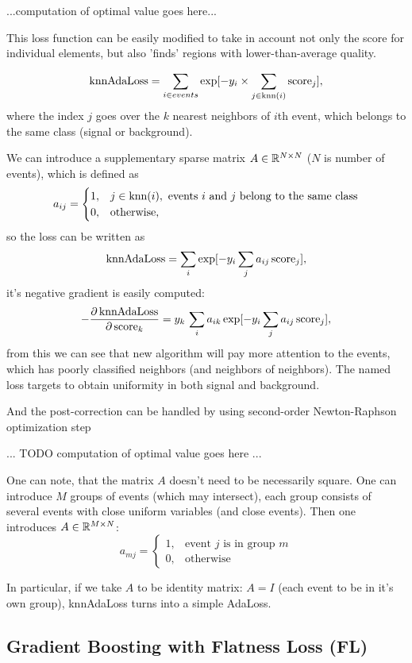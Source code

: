 ...computation of optimal value goes here...

This loss function can be easily modified to take in account not only the score for individual elements, but also 'finds' regions with lower-than-average quality.

\[
	\text{knnAdaLoss} = \sum_{i \in events} \exp[-y_i \times \sum_{j \in \text{knn}(i)} \text{score}_j],
\]
where the index $j$ goes over the $k$ nearest neighbors of $i$th event, which belongs to the same class (signal or background).

We can introduce a supplementary sparse matrix $A \in \mathbb{R}^{N \times N}$ ($N$ is number of events), which is defined as 
\[
a_{ij} = \begin{cases} 
1, & j \in \text{knn}(i), \text{ events $i$ and $j$ belong to the same class} \\
0, & \text{otherwise},
\end{cases}
\] so the loss can be written as
\[
	\text{knnAdaLoss} = \sum_i \exp [- y_i \sum_j a_{ij} \, \text{score}_j ],
\]
it's negative gradient is easily computed:
\[
	-\dfrac{\partial \, \text{knnAdaLoss}} {\partial \, \text{score}_k} = 
	 y_k \, \sum_i a_{ik} \exp [- y_i \sum_j a_{ij} \, \text{score}_j ],
\]
from this we can see that new algorithm will pay more attention to the events, which has poorly classified neighbors (and neighbors of neighbors). The named loss targets to obtain uniformity in both signal and background.

And the post-correction can be handled by using second-order Newton-Raphson optimization step 

... TODO computation of optimal value goes here ...

One can note, that the matrix $A$ doesn't need to be necessarily square. One can introduce $M$ groups of events (which may intersect), each group consists of several events with close uniform variables (and close events). Then one introduces $A \in \mathbb{R}^{M \times N}$:
\[
	a_{mj} = \begin{cases}
		1, & \text{event $j$ is in group $m$} \\
		0, & \text{otherwise}
	\end{cases}
\]

In particular, if we take $A$ to be identity matrix: $A = I$ (each event to be in it's own group), knnAdaLoss turns into a simple AdaLoss.



\subsection{Gradient Boosting with Flatness Loss (FL)}

